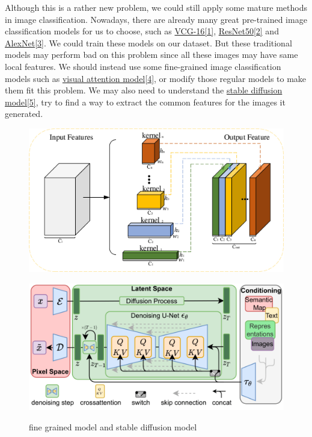 \documentclass[10pt]{article}
\begin{document}
Although this is a rather new problem, we could still apply some mature methods in image classification. Nowadays, there are already
many great pre-trained image classification models for us to choose, such as \href{https://arxiv.org/abs/1409.1556}{VCG-16[1]}, \href{https://arxiv.org/abs/1512.03385}{ResNet50[2]} and \href{https://papers.nips.cc/paper/2012/hash/c399862d3b9d6b76c8436e924a68c45b-Abstract.html}{AlexNet[3]}. We could train these models
on our dataset. But these traditional models may perform bad on this problem since all these images may have same local features. We should instead
use some fine-grained image classification models such as \href{https://arxiv.org/abs/1406.6247}{visual attention model[4]}, or modify those regular models to make them fit this problem.
We may also need to understand the \href{https://arxiv.org/abs/2112.10752}{stable diffusion model[5]}, try to find a way to extract the common features for the images it generated.

\vspace{10pt}

\begin{figure}[h]
\centering
  \begin{minipage}{.5\textwidth}
    \hspace{0.08\textwidth}
    \includegraphics[width=0.9\linewidth]{fine_grained_model.PNG}
    \label{fig:test1}
  \end{minipage}%
  \begin{minipage}{.5\textwidth}
    \hspace{0.02\textwidth}
    \includegraphics[width=0.9\linewidth]{stable_diffusion.png}
    \label{fig:test2}
\end{minipage}
\caption{fine grained model and stable diffusion model}
\end{figure}
\end{document}
